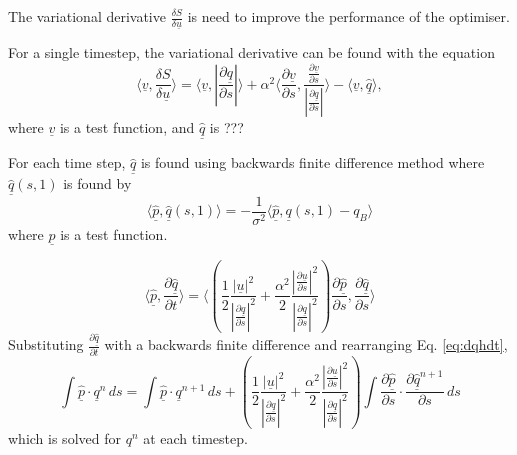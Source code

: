 \documentclass[a4paper, 10pt]{article}
\newcommand{\eq}[1]{Eq. \ref{eq:#1}}
\newcommand{\vect}[1]{\ensuremath{\underline{#1}}}
\newcommand{\hvect}[1]{\ensuremath{\hat{\vect{#1}}}}
\begin{document}
The variational derivative $\frac{\delta S}{\delta \vect u}$ is need to improve
the performance of the optimiser. 

For a single timestep, the variational derivative can be found with the equation
\begin{equation}
  \label{eq:dsdu}
  \langle \vect v, \frac{\delta S}{\delta \vect u}\rangle =
  \langle \vect v, \left| \frac{\partial \vect q}{\partial s}\right |\rangle 
  + \alpha^2 \langle \frac{\partial \vect v}{\partial s},
  \frac{\frac{\partial \vect v}{\partial s} }{ \left|\frac{\partial \vect q}{\partial s}\right|}
\rangle - \langle \vect v, \hvect{q} \rangle,
\end{equation}
where $\vect v$ is a test function, and $\hvect q$ is  ???

For each time step, $\hvect q$ is found using backwards finite difference method
where $\hvect q(s,1)$ is found by
\begin{equation}
  \label{eq:qh1}
  \langle \hvect p, \hvect q(s,1) \rangle = - \frac{1}{\sigma^2}
  \langle \hvect p, \vect q(s,1) - q_B \rangle
\end{equation}
where $\hvect p$ is a test function.


\begin{equation}
  \label{eq:dqhdt}
  \langle \hvect p, \frac{\partial \hvect q}{\partial t} \rangle =
  \langle
  \left( 
    \frac{1}{2}
    \frac{ 
      \left| \vect u \right|^2}{
      \left| \frac{\partial \vect q}{\partial s}\right|^2}
    +
    \frac{\alpha^2}{2}
    \frac{ 
      \left| \frac{\partial \vect u}{\partial s}\right|^2}{
      \left| \frac{\partial \vect q}{\partial s}\right|^2}
  \right)\frac{\partial \hvect p}{\partial s}, \frac{\partial \hvect q}{\partial s} \rangle
\end{equation}
Substituting $\frac{\partial \hvect q}{\partial t}$ with a backwards finite difference and
rearranging \eq{dqhdt},
\begin{equation}
  \label{eq:fd_qh}
  \int \hvect p \cdot \vect q^n \,ds = \int \hvect p \cdot \vect q^{n+1} \,ds
  +
   \left( 
    \frac{1}{2}
    \frac{ 
      \left| \vect u \right|^2}{
      \left| \frac{\partial \vect q}{\partial s}\right|^2}
    +
    \frac{\alpha^2}{2}
    \frac{ 
      \left| \frac{\partial \vect u}{\partial s}\right|^2}{
      \left| \frac{\partial \vect q}{\partial s}\right|^2}
  \right) \int \frac{ \partial \hvect p}{\partial s} 
  \cdot \frac{\partial \hvect q^{n+1}}{\partial s}\,ds
\end{equation}
which is solved for $q^n$ at each timestep.
\end{document}
